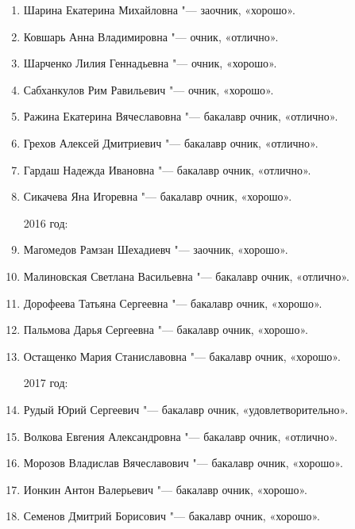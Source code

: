 \begin{enumerate}[nosep]
{2015 год:}
	\item Шарина Екатерина Михайловна "--- заочник, «хорошо».
	\item Ковшарь Анна Владимировна "--- очник, «отлично».
	\item Шарченко Лилия Геннадьевна "--- очник, «хорошо».
	\item Сабханкулов Рим Равильевич "--- очник, «хорошо».
	\item Ражина Екатерина Вячеславовна "--- бакалавр очник, «отлично».
	\item Грехов Алексей Дмитриевич "--- бакалавр очник, «отлично».
	\item Гардаш Надежда Ивановна "--- бакалавр очник, «отлично».
	\item Сикачева Яна Игоревна "--- бакалавр очник, «хорошо».
	
{2016 год:}
	\item Магомедов Рамзан Шехадиевч "--- заочник, «хорошо».
	\item Малиновская Светлана Васильевна "--- бакалавр очник, «отлично».
	\item Дорофеева Татьяна Сергеевна "--- бакалавр очник, «хорошо».
	\item Пальмова Дарья Сергеевна "--- бакалавр очник, «хорошо».
	\item Остащенко Мария Станиславовна "--- бакалавр очник, «хорошо».
	
{2017 год:}
	\item Рудый Юрий Сергеевич "--- бакалавр очник, «удовлетворительно».
	\item Волкова Евгения Александровна "--- бакалавр очник, «отлично».
	\item Морозов Владислав Вячеславович "--- бакалавр очник, «хорошо».
	\item Ионкин Антон Валерьевич "--- бакалавр очник, «хорошо».
	\item Семенов Дмитрий Борисович "--- бакалавр очник, «хорошо».
\end{enumerate}
